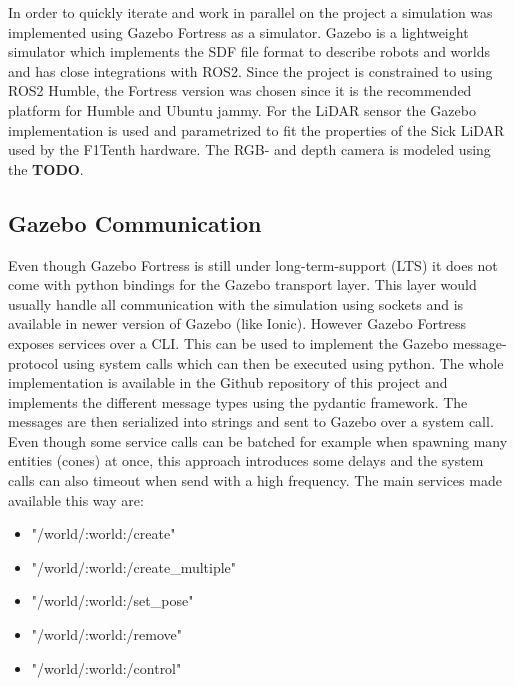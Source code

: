 In order to quickly iterate and work in parallel on the project a simulation was implemented using Gazebo Fortress as a simulator.
Gazebo is a lightweight simulator which implements the SDF file format to describe robots and worlds and has close integrations with ROS2.
Since the project is constrained to using ROS2 Humble, the Fortress version was chosen since it is the recommended platform for Humble and Ubuntu jammy.
For the LiDAR sensor the Gazebo implementation is used and parametrized to fit the properties of the Sick LiDAR used by the F1Tenth hardware.
The RGB- and depth camera is modeled using the \textbf{TODO}.

\subsection{Gazebo Communication}

Even though Gazebo Fortress is still under long-term-support (LTS) it does not come with python bindings for the Gazebo transport layer. 
This layer would usually handle all communication with the simulation using sockets and is available in newer version of Gazebo (like Ionic). 
However Gazebo Fortress exposes services over a CLI. This can be used to implement the Gazebo message-protocol using system calls which can then be executed using python. 
The whole implementation is available in the Github repository of this project and implements the different message types using the pydantic framework. 
The messages are then serialized into strings and sent to Gazebo over a system call. 
Even though some service calls can be batched for example when spawning many entities (cones) at once, 
this approach introduces some delays and the system calls can also timeout when send with a high frequency.
The main services made available this way are:

\begin{itemize}
\item "/world/:world:/create"
\item "/world/:world:/create\_multiple"
\item "/world/:world:/set\_pose"
\item "/world/:world:/remove"
\item "/world/:world:/control"
\end{itemize}

